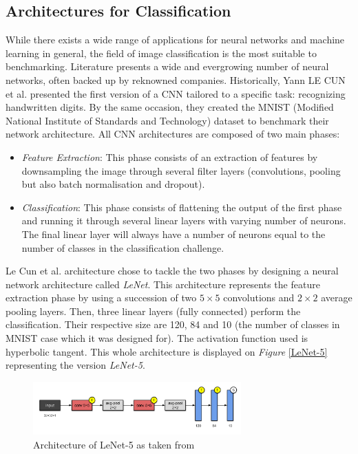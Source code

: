 
\subsection{Architectures for Classification}

While there exists a wide range of applications for neural networks and machine learning in general, the field of image classification is the most suitable to benchmarking. Literature presents a wide and evergrowing number of neural networks, often backed up by reknowned companies. Historically, Yann LE CUN et al. \cite{LeCun} presented the first version of a CNN tailored to a specific task: recognizing handwritten digits. By the same occasion, they created the MNIST (Modified National Institute of Standards and Technology) dataset to benchmark their network architecture. All CNN architectures are composed of two main phases:
\begin{itemize}
  \item \emph{Feature Extraction}: This phase consists of an extraction of features by downsampling the image through several filter layers (convolutions, pooling but also batch normalisation and dropout).
  \item \emph{Classification}: This phase consists of flattening the output of the first phase and running it through several linear layers with varying number of neurons. The final linear layer will always have a number of neurons equal to the number of classes in the classification challenge.
\end{itemize}

Le Cun et al. \cite{LeCun1998} architecture chose to tackle the two phases by designing a neural network architecture called \emph{LeNet}. This architecture represents the feature extraction phase by using a succession of two $5 \times 5$ convolutions and $2 \times 2$ average pooling layers. Then, three linear layers (fully connected) perform the classification. Their respective size are 120, 84 and 10 (the number of classes in MNIST \cite{LeCun2010} case which it was designed for). The activation function used is hyperbolic tangent. This whole architecture is displayed on \emph{Figure} \ref{LeNet-5} representing the version \emph{LeNet-5}.

\begin{figure}[htbp]
	\centering
		\includegraphics[width=8cm]{Figures/LeNet-5.png}
	\caption[LeNet-5]{Architecture of LeNet-5 as taken from \cite{LeCun1998}}
	\label{fig:LeNet-5}
\end{figure}

